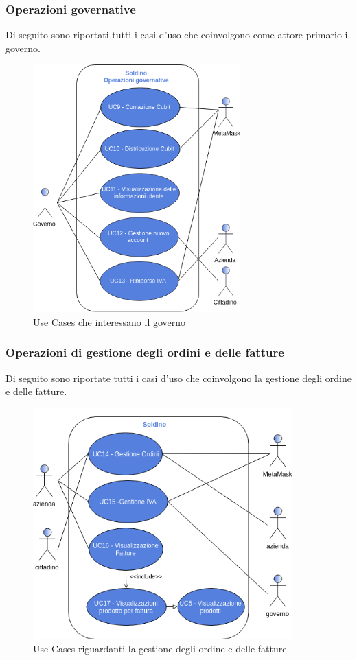 \subsubsection*{Operazioni governative}
Di seguito sono riportati tutti i casi d'uso che coinvolgono come attore primario il governo.

\begin{figure}[H]
	\includegraphics[width=8cm]{res/images/UseCaseGoverno.png}
	\centering
	\caption{Use Cases che interessano il governo}
\end{figure}



\subsubsection*{Operazioni di gestione degli ordini e delle fatture}
Di seguito sono riportate tutti i casi d'uso che coinvolgono la gestione degli ordine e delle fatture.

\begin{figure}[H]
	\includegraphics[width=10cm]{res/images/UseCaseFinali.png}
	\centering
	\caption{Use Cases riguardanti la gestione degli ordine e delle fatture}
\end{figure}




